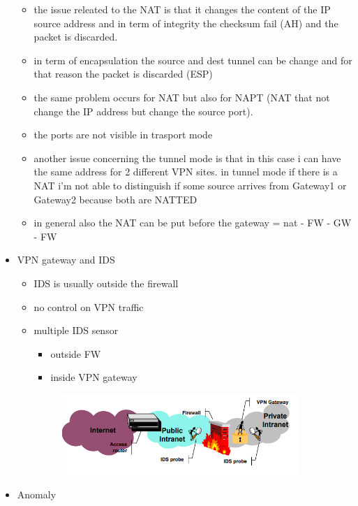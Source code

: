 \documentclass{article}
\begin{document}
\begin{itemize}
\begin{itemize}
        \item the issue releated to the NAT is that it changes the content of the IP source address and in term of integrity the checksum fail (AH) and the packet is discarded.
        \item in term of encapsulation the source and dest tunnel can be change and for that reason the packet is discarded (ESP)
        \item the same problem occurs for NAT but also for NAPT (NAT that not change the IP address but change the source port). 
        \item the ports are not visible in trasport mode 
        \item another issue concerning the tunnel mode is that in this case i can have the same address for 2 different VPN sites. in tunnel mode if there is a NAT i'm not able to distinguish if some source arrives from Gateway1 or Gateway2 because both are NATTED
        \item in general also the NAT can be put before the gateway = nat - FW - GW - FW
    \end{itemize}
    \item VPN gateway and IDS
    \begin{itemize}
        \item IDS is usually outside the firewall
        \item no control on VPN traffic
        \item multiple IDS sensor
        \begin{itemize}
            \item outside FW
            \item inside VPN gateway
        \end{itemize}
        \begin{figure}[h]
        \centering
            \includegraphics[width=0.90\textwidth]{figure/VPN_and_IDS.png}
        \end{figure}
    \end{itemize}
    \item Anomaly

\end{itemize}
\end{document}
